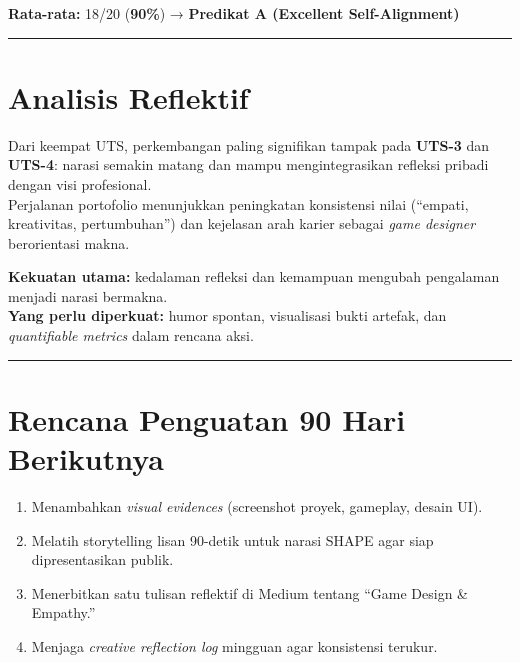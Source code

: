 \documentclass[
  letterpaper,
  DIV=11,
  numbers=noendperiod]{scrreprt}
\providecommand{\tightlist}{%
  \setlength{\itemsep}{0pt}\setlength{\parskip}{0pt}}
\begin{document}
\textbf{Rata-rata:} 18/20 (\textbf{90\%}) → \textbf{Predikat A
(Excellent Self-Alignment)}

\begin{center}\rule{0.5\linewidth}{0.5pt}\end{center}

\section{Analisis Reflektif}\label{analisis-reflektif}

Dari keempat UTS, perkembangan paling signifikan tampak pada
\textbf{UTS-3} dan \textbf{UTS-4}: narasi semakin matang dan mampu
mengintegrasikan refleksi pribadi dengan visi profesional.\\
Perjalanan portofolio menunjukkan peningkatan konsistensi nilai
(``empati, kreativitas, pertumbuhan'') dan kejelasan arah karier sebagai
\emph{game designer} berorientasi makna.

\textbf{Kekuatan utama:} kedalaman refleksi dan kemampuan mengubah
pengalaman menjadi narasi bermakna.\\
\textbf{Yang perlu diperkuat:} humor spontan, visualisasi bukti artefak,
dan \emph{quantifiable metrics} dalam rencana aksi.

\begin{center}\rule{0.5\linewidth}{0.5pt}\end{center}

\section{Rencana Penguatan 90 Hari
Berikutnya}\label{rencana-penguatan-90-hari-berikutnya}

\begin{enumerate}
\def\labelenumi{\arabic{enumi}.}
\tightlist
\item
  Menambahkan \emph{visual evidences} (screenshot proyek, gameplay,
  desain UI).\\
\item
  Melatih storytelling lisan 90-detik untuk narasi SHAPE agar siap
  dipresentasikan publik.\\
\item
  Menerbitkan satu tulisan reflektif di Medium tentang ``Game Design \&
  Empathy.''\\
\item
  Menjaga \emph{creative reflection log} mingguan agar konsistensi
  terukur.
\end{enumerate}
\end{document}

